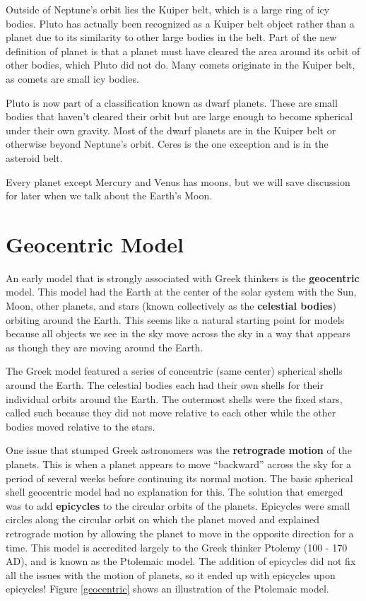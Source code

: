\documentclass[12pt]{book}
\begin{document}
Outside of Neptune's orbit lies the Kuiper belt, which is a large ring of icy bodies. Pluto has actually been recognized as a Kuiper belt object rather than a planet due to its similarity to other large bodies in the belt. Part of the new definition of planet is that a planet must have cleared the area around its orbit of other bodies, which Pluto did not do. Many comets originate in the Kuiper belt, as comets are small icy bodies.

Pluto is now part of a classification known as dwarf planets. These are small bodies that haven't cleared their orbit but are large enough to become spherical under their own gravity. Most of the dwarf planets are in the Kuiper belt or otherwise beyond Neptune's orbit. Ceres is the one exception and is in the asteroid belt.

Every planet except Mercury and Venus has moons, but we will save discussion for later when we talk about the Earth's Moon.

\section{Geocentric Model}

An early model that is strongly associated with Greek thinkers is the \textbf{geocentric} model. This model had the Earth at the center of the solar system with the Sun, Moon, other planets, and stars (known collectively as the \textbf{celestial bodies}) orbiting around the Earth. This seems like a natural starting point for models because all objects we see in the sky move across the sky in a way that appears as though they are moving around the Earth.

The Greek model featured a series of concentric (same center) spherical shells around the Earth. The celestial bodies each had their own shells for their individual orbits around the Earth. The outermost shells were the fixed stars, called such because they did not move relative to each other while the other bodies moved relative to the stars.

One issue that stumped Greek astronomers was the \textbf{retrograde motion} of the planets. This is when a planet appears to move ``backward'' across the sky for a period of several weeks before continuing its normal motion. The basic spherical shell geocentric model had no explanation for this. The solution that emerged was to add \textbf{epicycles} to the circular orbits of the planets. Epicycles were small circles along the circular orbit on which the planet moved and explained retrograde motion by allowing the planet to move in the opposite direction for a time. This model is accredited largely to the Greek thinker Ptolemy (100 - 170 AD), and is known as the Ptolemaic model. The addition of epicycles did not fix all the issues with the motion of planets, so it ended up with epicycles upon epicycles! Figure \ref{geocentric} shows an illustration of the Ptolemaic model.
\end{document}

